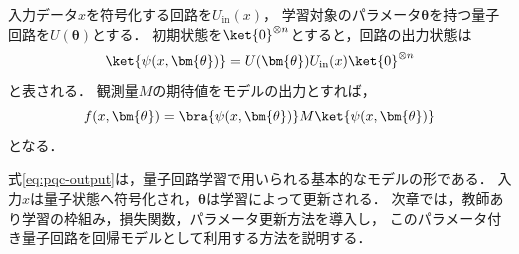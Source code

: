 入力データ$x$を符号化する回路を$U_{\mathrm{in}}(x)$，
学習対象のパラメータ$\bm{\theta}$を持つ量子回路を$U(\bm{\theta})$とする．
初期状態を$\ket{0}^{\otimes n}$とすると，回路の出力状態は
\begin{equation}
  \ket{\psi(x,\bm{\theta})}
  =
  U(\bm{\theta})
  U_{\mathrm{in}}(x)
  \ket{0}^{\otimes n}
  \label{eq:parameterized-quantum-state}
\end{equation}
と表される．
観測量$M$の期待値をモデルの出力とすれば，
\begin{equation}
  f(x,\bm{\theta})
  =
  \bra{\psi(x,\bm{\theta})}
  M
  \ket{\psi(x,\bm{\theta})}
  \label{eq:pqc-output}
\end{equation}
となる．

式\eqref{eq:pqc-output}は，量子回路学習で用いられる基本的なモデルの形である．
入力$x$は量子状態へ符号化され，$\bm{\theta}$は学習によって更新される．
次章では，教師あり学習の枠組み，損失関数，パラメータ更新方法を導入し，
このパラメータ付き量子回路を回帰モデルとして利用する方法を説明する．

